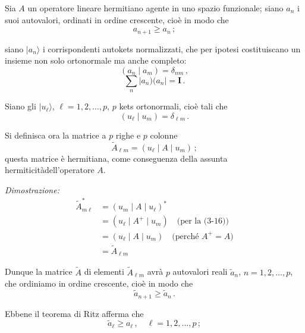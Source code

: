 \documentclass[11pt, a4paper]{book}
\numberwithin{equation}{section}
\begin{document}
Sia $A$ un operatore lineare hermitiano agente in uno spazio funzionale;
siano $a_n$ i suoi autovalori, ordinati in ordine crescente, cioè in modo che
\begin{equation}
a_{n+1} \geq a_n \,; \tag{1}
\end{equation}


siano $|a_n\rangle$ i corrispondenti autokets normalizzati, che per ipotesi
costituiscano un insieme non solo ortonormale ma anche completo:
\begin{equation}
(a_n \mid a_m) = \delta_{nm} \,, \tag{2}
\end{equation}
\begin{equation}
\sum_n |a_n)(a_n| = \mathbf{I} \,. \tag{3}
\end{equation}

Siano gli $|u_\ell\rangle$, $\ell = 1, 2, \ldots, p$, $p$ kets ortonormali,
cioè tali che
\begin{equation}
(u_\ell \mid u_m) = \delta_{\ell m} \,. \tag{4}
\end{equation}

Si definisca ora la matrice a $p$ righe e $p$ colonne
\begin{equation}
\tilde{A}_{\ell m} = (u_\ell \mid A \mid u_m) \,; \tag{5}
\end{equation}
questa matrice è hermitiana, come conseguenza della assunta hermiticitàdell'operatore $A$.

\textit{Dimostrazione:}
\begin{align*}
\tilde{A}^*_{m\ell} &= (u_m \mid A \mid u_\ell)^* \\
&= (u_\ell \mid A^+ \mid u_m) \quad \text{(per la (3-16))} \\
&= (u_\ell \mid A \mid u_m) \quad \text{(perché $A^+ = A$)} \\
&= \tilde{A}_{\ell m}
\end{align*}

Dunque la matrice $\tilde{A}$ di elementi $\tilde{A}_{\ell m}$ avrà $p$ autovalori reali
$\tilde{a}_n$, $n = 1, 2, \ldots, p$, che ordiniamo in ordine crescente, cioè
in modo che
\begin{equation}
\tilde{a}_{n+1} \geq \tilde{a}_n \,. \tag{6}
\end{equation}

Ebbene il teorema di Ritz afferma che
\begin{equation}
\tilde{a}_\ell \geq a_\ell \,, \quad \ell = 1, 2, \ldots, p \,; \tag{7}
\end{equation}
\end{document}
